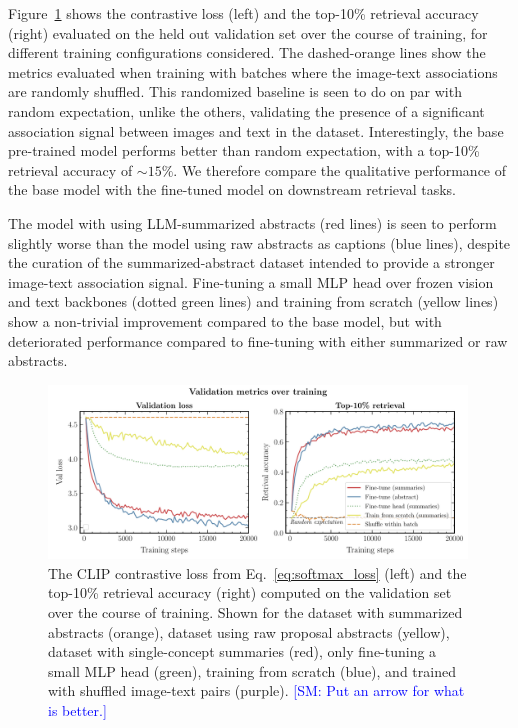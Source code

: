 \documentclass[10pt]{article} %
\newcommand{\SM}[1]{\textcolor{blue}{[SM: #1]}}
\begin{document}
Figure~\ref{fig:retrieval_acc} shows the contrastive loss (left) and the top-10\% retrieval accuracy (right) evaluated on the held out validation set over the course of training, for different training configurations considered.
%
The dashed-orange lines show the metrics evaluated when training with batches where the image-text associations are randomly shuffled.
%
This randomized baseline is seen to do on par with random expectation, unlike the others, validating the presence of a significant association signal between images and text in the dataset.
%
Interestingly, the base pre-trained model performs better than random expectation, with a top-10\% retrieval accuracy of $\sim 15\%$.
%
We therefore compare the qualitative performance of the base model with the fine-tuned model on downstream retrieval tasks.

The model with using LLM-summarized abstracts (red lines) is seen to perform slightly worse than the model using raw abstracts as captions (blue lines), despite the curation of the summarized-abstract dataset intended to provide a stronger image-text association signal.
%
Fine-tuning a small MLP head over frozen vision and text backbones (dotted green lines) and training from scratch (yellow lines) show a non-trivial improvement compared to the base model, but with deteriorated performance compared to fine-tuning with either summarized or raw abstracts.

\begin{figure}[!h]
\includegraphics[width=0.99\textwidth]{plots/val_metrics.pdf}
\caption{The CLIP contrastive loss from Eq.~\ref{eq:softmax_loss} (left) and the top-10\% retrieval accuracy (right) computed on the validation set over the course of training. Shown for the dataset with summarized abstracts (orange), dataset using raw proposal abstracts (yellow), dataset with single-concept summaries (red), only fine-tuning a small MLP head (green), training from scratch (blue), and trained with shuffled image-text pairs (purple). \SM{Put an arrow for what is better.}}
\label{fig:retrieval_acc}
\end{figure}
\end{document}
